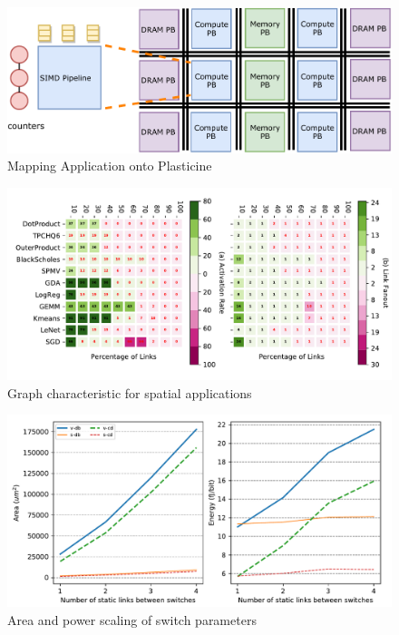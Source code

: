 \documentclass[portrait,a0,final]{a0poster}
\begin{document}
\begin{multicols}{3}
\begin{figure}[H]
\caption{Mapping Application onto Plasticine}
\label{fig:mapping}
\centering
\includegraphics[width=1\linewidth]{figs/arch.pdf}
\end{figure}

\begin{figure}[H]
\caption{Graph characteristic for spatial applications}
\label{fig:link}
\centering
\includegraphics[width=1\linewidth]{figs/link5.pdf}
\end{figure}

\begin{figure}[H]
\caption{Area and power scaling of switch parameters}
\label{fig:switch}
\centering
\includegraphics[width=1\linewidth]{figs/switch.pdf}
\end{figure}


\end{multicols}
\end{document}
